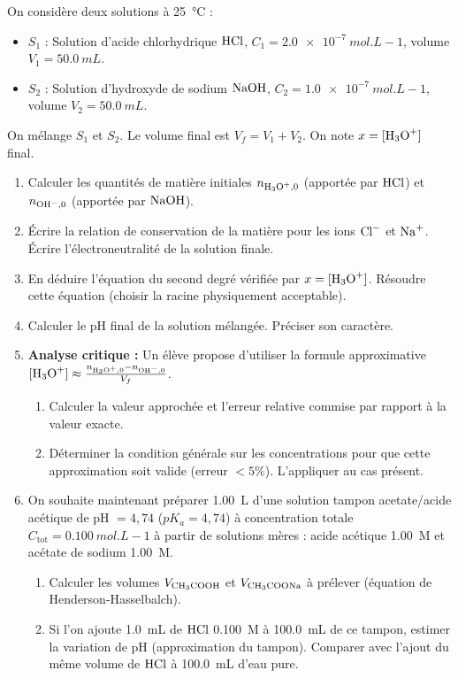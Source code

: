 \documentclass[11pt]{article}
\begin{document}
\begin{exercice}
On considère deux solutions à \SI{25}{\celsius} :
\begin{itemize}
    \item $S_1$ : Solution d'acide chlorhydrique $\ce{HCl}$, $C_1 = \SI{2,0e-7}{mol.L-1}$, volume $V_1 = \SI{50,0}{mL}$.
    \item $S_2$ : Solution d'hydroxyde de sodium $\ce{NaOH}$, $C_2 = \SI{1,0e-7}{mol.L-1}$, volume $V_2 = \SI{50,0}{mL}$.
\end{itemize}
On mélange $S_1$ et $S_2$. Le volume final est $V_f = V_1 + V_2$. On note $x = [\ce{H3O+}]$ final.

\begin{enumerate}
    \item Calculer les quantités de matière initiales $n_{\ce{H3O+},0}$ (apportée par $\ce{HCl}$) et $n_{\ce{OH-},0}$ (apportée par $\ce{NaOH}$).
    \item Écrire la relation de conservation de la matière pour les ions $\ce{Cl-}$ et $\ce{Na+}$. Écrire l'électroneutralité de la solution finale.
    \item En déduire l'équation du second degré vérifiée par $x = [\ce{H3O+}]$. Résoudre cette équation (choisir la racine physiquement acceptable).
    \item Calculer le pH final de la solution mélangée. Préciser son caractère.
    \item \textbf{Analyse critique :} Un élève propose d'utiliser la formule approximative $[\ce{H3O+}] \approx \frac{n_{\ce{H3O+},0} - n_{\ce{OH-},0}}{V_f}$.
    \begin{enumerate}
        \item Calculer la valeur approchée et l'erreur relative commise par rapport à la valeur exacte.
        \item Déterminer la condition générale sur les concentrations pour que cette approximation soit valide (erreur $< 5\%$). L'appliquer au cas présent.
    \end{enumerate}
    \item On souhaite maintenant préparer \SI{1,00}{L} d'une solution tampon acetate/acide acétique de pH $= 4,74$ ($pK_a = 4,74$) à concentration totale $C_{\text{tot}} = \SI{0,100}{mol.L-1}$ à partir de solutions mères : acide acétique \SI{1,00}{M} et acétate de sodium \SI{1,00}{M}.
    \begin{enumerate}
        \item Calculer les volumes $V_{\ce{CH3COOH}}$ et $V_{\ce{CH3COONa}}$ à prélever (équation de Henderson-Hasselbalch).
        \item Si l'on ajoute \SI{1,0}{mL} de $\ce{HCl}$ \SI{0,100}{M} à \SI{100,0}{mL} de ce tampon, estimer la variation de pH (approximation du tampon). Comparer avec l'ajout du même volume de $\ce{HCl}$ à \SI{100,0}{mL} d'eau pure.
    \end{enumerate}
\end{enumerate}
\end{exercice}
\end{document}
